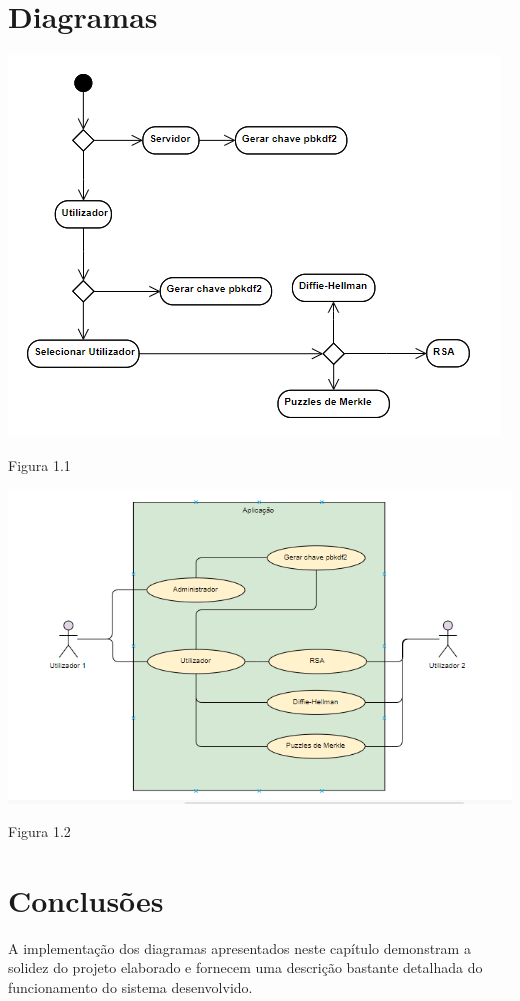 \section{Diagramas}
\label{chap3:sec:concs}



\newline\begin{center}\includegraphics[scale=0.9]{img/atividadessi.png}\newline\caption{Figura 1.1}\end{center}


\newline\begin{center}\includegraphics[scale=0.9]{img/casosdeusosi.png}\newline\caption{Figura 1.2}\end{center}



\section{Conclusões}
\label{chap3:sec:concs}
A implementação dos diagramas apresentados neste capítulo demonstram a solidez do projeto elaborado e fornecem uma descrição bastante detalhada do funcionamento do sistema desenvolvido.